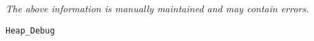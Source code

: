 \label{pkg:heap\_debug}

{\tiny \it The above information is manually maintained and may contain errors.}
\begin{verbatim}
Heap_Debug
\end{verbatim}
